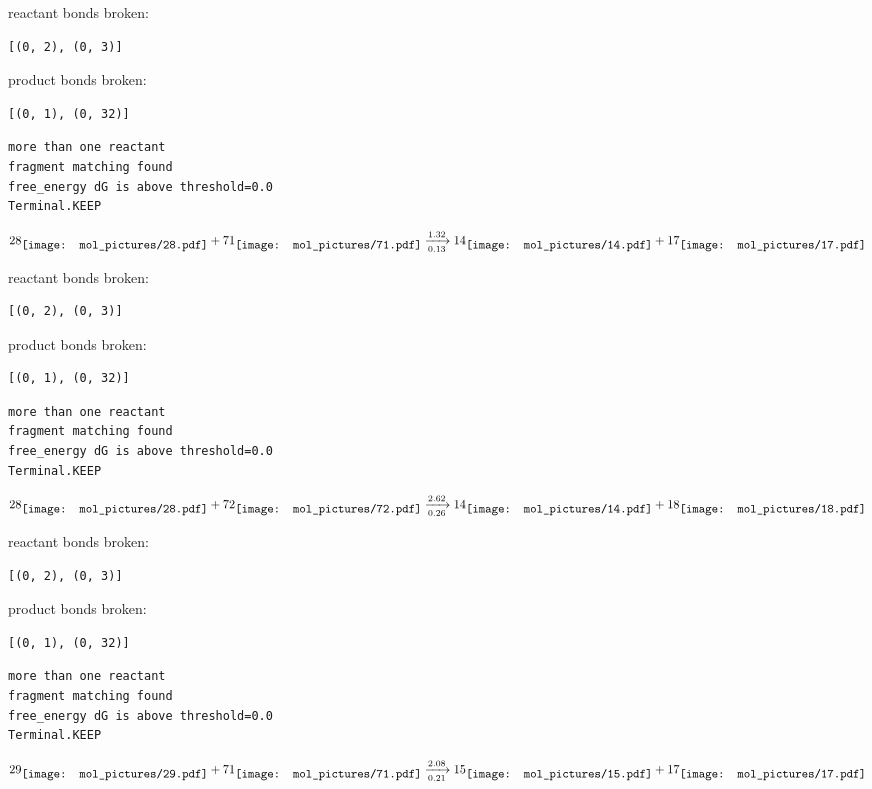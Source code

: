 \documentclass{article}
\begin{document}
reactant bonds broken:\begin{verbatim}
[(0, 2), (0, 3)]
\end{verbatim}
product bonds broken:\begin{verbatim}
[(0, 1), (0, 32)]
\end{verbatim}




\vspace{1cm}
\begin{verbatim}
more than one reactant
fragment matching found
free_energy dG is above threshold=0.0
Terminal.KEEP
\end{verbatim}
$$
28
\raisebox{-.5\height}{\texttt{[image: mol\_pictures/28.pdf]}}
+
71
\raisebox{-.5\height}{\texttt{[image: mol\_pictures/71.pdf]}}
\xrightarrow[0.13]{1.32}
14
\raisebox{-.5\height}{\texttt{[image: mol\_pictures/14.pdf]}}
+
17
\raisebox{-.5\height}{\texttt{[image: mol\_pictures/17.pdf]}}
$$


reactant bonds broken:\begin{verbatim}
[(0, 2), (0, 3)]
\end{verbatim}
product bonds broken:\begin{verbatim}
[(0, 1), (0, 32)]
\end{verbatim}




\vspace{1cm}
\begin{verbatim}
more than one reactant
fragment matching found
free_energy dG is above threshold=0.0
Terminal.KEEP
\end{verbatim}
$$
28
\raisebox{-.5\height}{\texttt{[image: mol\_pictures/28.pdf]}}
+
72
\raisebox{-.5\height}{\texttt{[image: mol\_pictures/72.pdf]}}
\xrightarrow[0.26]{2.62}
14
\raisebox{-.5\height}{\texttt{[image: mol\_pictures/14.pdf]}}
+
18
\raisebox{-.5\height}{\texttt{[image: mol\_pictures/18.pdf]}}
$$


reactant bonds broken:\begin{verbatim}
[(0, 2), (0, 3)]
\end{verbatim}
product bonds broken:\begin{verbatim}
[(0, 1), (0, 32)]
\end{verbatim}




\vspace{1cm}
\begin{verbatim}
more than one reactant
fragment matching found
free_energy dG is above threshold=0.0
Terminal.KEEP
\end{verbatim}
$$
29
\raisebox{-.5\height}{\texttt{[image: mol\_pictures/29.pdf]}}
+
71
\raisebox{-.5\height}{\texttt{[image: mol\_pictures/71.pdf]}}
\xrightarrow[0.21]{2.08}
15
\raisebox{-.5\height}{\texttt{[image: mol\_pictures/15.pdf]}}
+
17
\raisebox{-.5\height}{\texttt{[image: mol\_pictures/17.pdf]}}
$$
\end{document}
